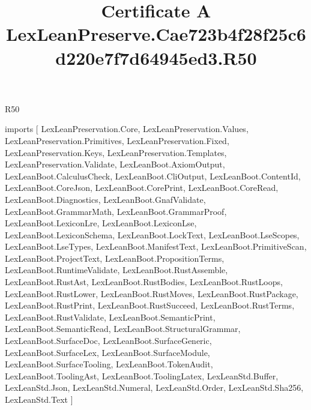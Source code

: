 \begin{lexlean}{R50}
\title{Certificate A LexLeanPreserve.Cae723b4f28f25c6d220e7f7d64945ed3.R50}
\begin{coremodule}
imports [
  LexLeanPreservation.Core,
  LexLeanPreservation.Values,
  LexLeanPreservation.Primitives,
  LexLeanPreservation.Fixed,
  LexLeanPreservation.Keys,
  LexLeanPreservation.Templates,
  LexLeanPreservation.Validate,
  LexLeanBoot.AxiomOutput,
  LexLeanBoot.CalculusCheck,
  LexLeanBoot.CliOutput,
  LexLeanBoot.ContentId,
  LexLeanBoot.CoreJson,
  LexLeanBoot.CorePrint,
  LexLeanBoot.CoreRead,
  LexLeanBoot.Diagnostics,
  LexLeanBoot.GnafValidate,
  LexLeanBoot.GrammarMath,
  LexLeanBoot.GrammarProof,
  LexLeanBoot.LexiconLre,
  LexLeanBoot.LexiconLse,
  LexLeanBoot.LexiconSchema,
  LexLeanBoot.LockText,
  LexLeanBoot.LseScopes,
  LexLeanBoot.LseTypes,
  LexLeanBoot.ManifestText,
  LexLeanBoot.PrimitiveScan,
  LexLeanBoot.ProjectText,
  LexLeanBoot.PropositionTerms,
  LexLeanBoot.RuntimeValidate,
  LexLeanBoot.RustAssemble,
  LexLeanBoot.RustAst,
  LexLeanBoot.RustBodies,
  LexLeanBoot.RustLoops,
  LexLeanBoot.RustLower,
  LexLeanBoot.RustMoves,
  LexLeanBoot.RustPackage,
  LexLeanBoot.RustPrint,
  LexLeanBoot.RustSucceed,
  LexLeanBoot.RustTerms,
  LexLeanBoot.RustValidate,
  LexLeanBoot.SemanticPrint,
  LexLeanBoot.SemanticRead,
  LexLeanBoot.StructuralGrammar,
  LexLeanBoot.SurfaceDoc,
  LexLeanBoot.SurfaceGeneric,
  LexLeanBoot.SurfaceLex,
  LexLeanBoot.SurfaceModule,
  LexLeanBoot.SurfaceTooling,
  LexLeanBoot.TokenAudit,
  LexLeanBoot.ToolingAst,
  LexLeanBoot.ToolingLatex,
  LexLeanStd.Buffer,
  LexLeanStd.Json,
  LexLeanStd.Numeral,
  LexLeanStd.Order,
  LexLeanStd.Sha256,
  LexLeanStd.Text
]


\end{coremodule}
\end{lexlean}
